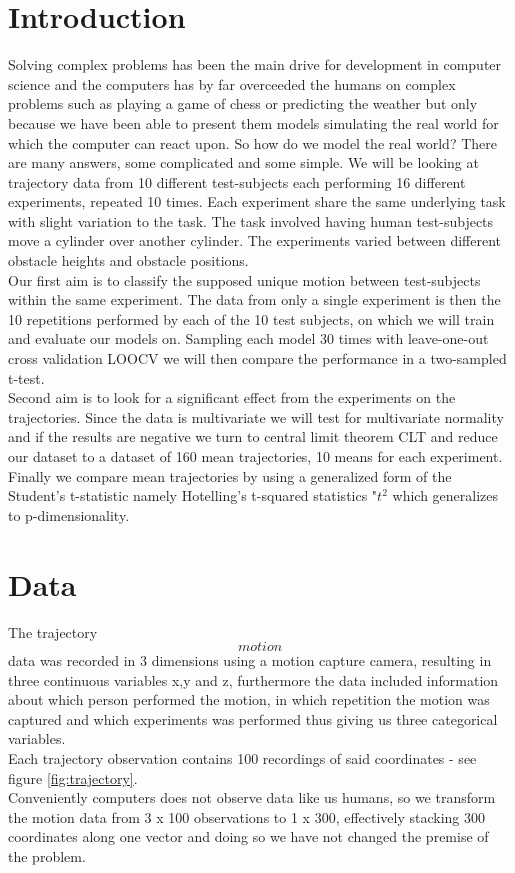 \documentclass{article}
\begin{document}
\section{Introduction}
Solving complex problems has been the main drive for development in computer science and the computers has by far overceeded the humans on complex problems such as playing a game of chess or predicting the weather but only because we have been able to present them models simulating the real world for which the computer can react upon. So how do we model the real world? There are many answers, some complicated and some simple. We will be looking at trajectory data from 10 different test-subjects each performing 16 different experiments, repeated 10 times. Each experiment share the same underlying task with slight variation to the task. The task involved having human test-subjects move a cylinder over another cylinder. The experiments varied between different obstacle heights and obstacle positions. \\ Our first aim is to classify the supposed unique motion between test-subjects within the same experiment. The data from only a single experiment is then the 10 repetitions performed by each of the 10 test subjects, on which we will train and evaluate our models on. Sampling each model 30 times with leave-one-out cross validation LOOCV we will then compare the performance in a two-sampled t-test. \\Second aim is to look for a significant effect from the experiments on the trajectories. Since the data is multivariate we will test for multivariate normality and if the results are negative we turn to central limit theorem CLT and reduce our dataset to a dataset of 160 mean trajectories, 10 means for each experiment. Finally we compare mean trajectories by using a generalized form of the Student's t-statistic namely Hotelling's t-squared statistics "$t^{2}$ which generalizes to p-dimensionality.


\section{Data}
The trajectory \[motion\] data was recorded in 3 dimensions using a motion capture camera, resulting in three continuous variables x,y and z, furthermore the data included information about which person performed the motion, in which repetition the motion was captured and which experiments was performed thus giving us three categorical variables. \\ Each trajectory observation contains 100 recordings of said coordinates - see figure \ref{fig:trajectory}. \\Conveniently computers does not observe data like us humans, so we transform the motion data from 3 x 100 observations to 1 x 300, effectively stacking 300 coordinates along one vector and doing so we have not changed the premise of the problem.
\end{document}
